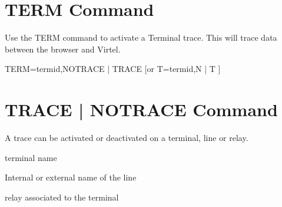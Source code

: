 \documentclass[letterpaper,10pt,english]{sphinxmanual}
\begin{document}
\ignorespaces 

\section{TERM Command}
\label{\detokenize{audit_operations_ and_performance:term-command}}\label{\detokenize{audit_operations_ and_performance:index-26}}
\sphinxAtStartPar
Use the TERM command to activate a Terminal trace. This will trace data between the browser and Virtel.

\sphinxAtStartPar
TERM=termid,NOTRACE | TRACE  {[}or T=termid,N | T {]}

\newpage

\ignorespaces 
{}\ignorespaces 

\section{TRACE | NOTRACE Command}
\label{\detokenize{audit_operations_ and_performance:trace-notrace-command}}\label{\detokenize{audit_operations_ and_performance:index-28}}
\sphinxAtStartPar
A trace can be activated or deactivated on a terminal, line or relay.

\begin{sphinxVerbatim}[commandchars=\\\{\}]
\end{sphinxVerbatim}
\begin{description}
\sphinxAtStartPar
terminal name

\sphinxAtStartPar
Internal or external name of the line

\sphinxAtStartPar
relay associated to the terminal

\end{description}
\end{document}
